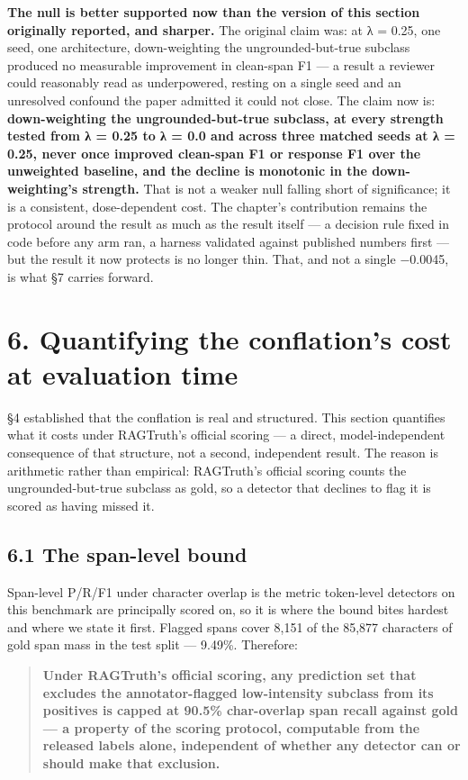 \documentclass[11pt]{article}
\begin{document}
\textbf{The null is better supported now than the version of this section originally reported, and
sharper.} The original claim was: at λ = 0.25, one seed, one architecture, down-weighting
the ungrounded-but-true subclass produced no measurable improvement in clean-span F1 --- a
result a reviewer could reasonably read as underpowered, resting on a single seed and an
unresolved confound the paper admitted it could not close. The claim now is: \textbf{down-weighting
the ungrounded-but-true subclass, at every strength tested from λ = 0.25 to λ = 0.0 and
across three matched seeds at λ = 0.25, never once improved clean-span F1 or response F1
over the unweighted baseline, and the decline is monotonic in the down-weighting's
strength.} That is not a weaker null falling short of significance; it is a consistent,
dose-dependent cost. The chapter's contribution remains the protocol around the result as
much as the result itself --- a decision rule fixed in code before any arm ran, a harness
validated against published numbers first --- but the result it now protects is no longer
thin. That, and not a single −0.0045, is what §7 carries forward.

\section{6. Quantifying the conflation's cost at evaluation time}\label{quantifying-the-conflations-cost-at-evaluation-time}

§4 established that the conflation is real and structured. This section quantifies what it
costs under RAGTruth's official scoring --- a direct, model-independent consequence of that
structure, not a second, independent result. The reason is arithmetic rather than empirical:
RAGTruth's official scoring counts the ungrounded-but-true subclass as gold, so a detector
that declines to flag it is scored as having missed it.

\subsection{6.1 The span-level bound}\label{the-span-level-bound}

Span-level P/R/F1 under character overlap is the metric token-level detectors on this
benchmark are principally scored on, so it is where the bound bites hardest and where we
state it first. Flagged spans cover 8,151 of the 85,877 characters of gold span mass in the
test split --- 9.49\%. Therefore:

\begin{quote}
\textbf{Under RAGTruth's official scoring, any prediction set that excludes the
annotator-flagged low-intensity subclass from its positives is capped at 90.5\%
char-overlap span recall against gold --- a property of the scoring protocol, computable
from the released labels alone, independent of whether any detector can or should make
that exclusion.}
\end{quote}
\end{document}
